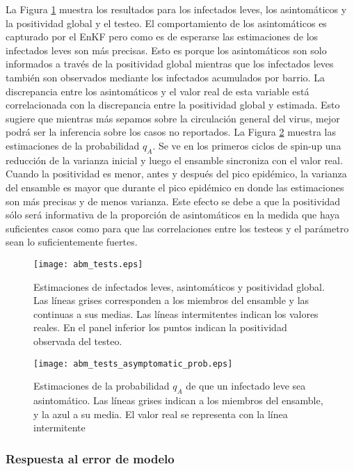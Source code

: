 La Figura \ref{fig:abm_tests} muestra los resultados para los infectados leves, los asintomáticos y la positividad global y el testeo. El comportamiento de los asintomáticos es capturado por el EnKF pero como es de esperarse las estimaciones de los infectados leves son más precisas. Esto es porque los asintomáticos son solo informados a través de la positividad global
mientras que los infectados leves también son observados mediante los infectados acumulados por barrio. La discrepancia entre los asintomáticos y el valor real de esta variable está correlacionada con la discrepancia entre la positividad global y estimada. Esto sugiere que mientras más sepamos sobre la circulación general del virus, mejor podrá ser la inferencia sobre los casos no reportados. La Figura \ref{fig:abm_tests_asymptomatic_prob} muestra las estimaciones de la probabilidad $q_A$. Se ve en los primeros ciclos de spin-up una reducción de la varianza inicial y luego el ensamble sincroniza con el valor real. Cuando la positividad es menor, antes y después del pico epidémico, la varianza del ensamble es mayor que durante el pico epidémico en donde las estimaciones son más precisas y de menos varianza. Este efecto se debe a que la positividad sólo será informativa de la proporción de asintomáticos en la medida que haya suficientes casos como para que las correlaciones entre los testeos y el parámetro sean lo suficientemente fuertes.
\begin{figure}[h]
    \centering
    \texttt{[image: abm\_tests.eps]}
    \caption{Estimaciones de infectados leves, asintomáticos y positividad global. Las líneas grises corresponden a los miembros del ensamble y las continuas a sus medias. Las líneas intermitentes indican los valores reales. En el panel inferior los puntos indican la positividad observada del testeo.}
    \label{fig:abm_tests}
\end{figure}
\begin{figure}[h]
    \centering
    \texttt{[image: abm\_tests\_asymptomatic\_prob.eps]}
    \caption{Estimaciones de la probabilidad $q_A$ de que un infectado leve sea asintomático. Las líneas grises indican a los miembros del ensamble, y la azul a su media. El valor real se representa con la línea intermitente}
    \label{fig:abm_tests_asymptomatic_prob}
\end{figure}

\subsubsection{Respuesta al error de modelo}

